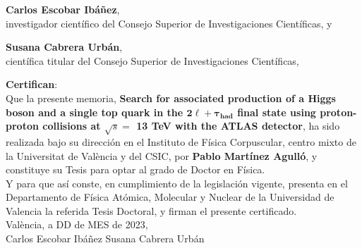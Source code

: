 \begin{titlepage}
\cleardoublepage
\thispagestyle{empty}

\thispagestyle{empty}

\vspace*{3cm}

\noindent \textbf{Carlos Escobar Ibáñez},\\
investigador científico del Consejo Superior de Investigaciones Cient\'ificas, y \vspace{0.2cm}

\noindent \textbf{Susana Cabrera Urbán},\\
cient\'ifica titular del Consejo Superior de Investigaciones Cient\'ificas, \vspace{0.2cm}

\noindent \textbf{Certifican}:\\[2ex]
%
\noindent Que la presente memoria, 
\textbf{Search for associated production of a Higgs boson and a single top quark in the $\boldsymbol{2\ell +\tau_{had}}$ final state using proton-proton collisions at $\sqrt{s}=$ 13 TeV with the ATLAS detector}, ha sido realizada bajo su direcci{\'o}n en el Instituto de F{\'i}sica Corpuscular, centro mixto de la Universitat de València y del CSIC, por \textbf{Pablo Martínez Agulló}, y constituye su Tesis para optar al grado de Doctor en F\'isica.\\[2ex]
%
\noindent Y para que as\'i conste, en cumplimiento de la legislaci\'on vigente, presenta en el Departamento de F\'isica At\'omica, Molecular y Nuclear de la Universidad de Valencia la referida Tesis Doctoral, y firman el presente certificado.\\[4ex]

\noindent València, a DD de MES de 2023,\\[12ex]

\noindent \hspace{2cm} Carlos Escobar Ib\'añez \hspace{2cm} Susana Cabrera Urb\'an


\newpage
\thispagestyle{empty}
$$ $$
\newpage
\thispagestyle{empty}
\end{titlepage}
